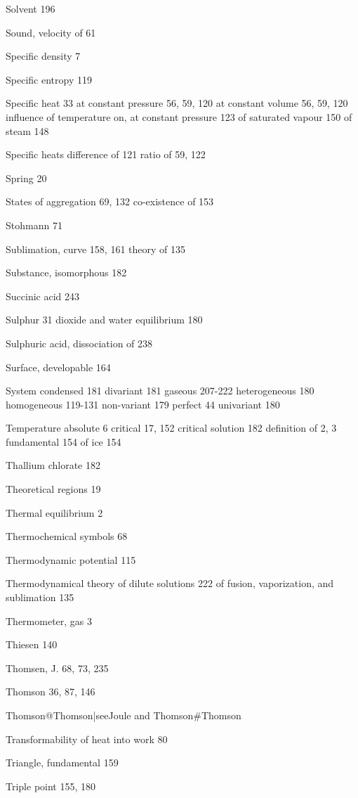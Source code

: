 \documentclass[12pt]{book}[2005/09/16]
\newcommand{\PageSep}[1]{\ignorespaces}
\begin{document}
Solvent 196

Sound, velocity of 61

Specific density 7

Specific entropy 119

Specific heat 33
  at constant pressure 56, 59, 120
  at constant volume 56, 59, 120
  influence of temperature on, at constant pressure 123
  of saturated vapour 150
  of steam 148

Specific heats
  difference of 121
  ratio of 59, 122

Spring 20

States of aggregation 69, 132
  co-existence of 153

Stohmann 71

Sublimation, curve 158, 161
  theory of 135

Substance, isomorphous 182

Succinic acid 243

Sulphur 31
  dioxide and water equilibrium 180

Sulphuric acid, dissociation of 238

Surface, developable 164

System
  condensed 181
  divariant 181
  gaseous 207-222
  heterogeneous 180
  homogeneous 119-131
  non-variant 179
  perfect 44
  univariant 180



Temperature
  absolute 6
  critical 17, 152
  critical solution 182
  definition of 2, 3
  fundamental 154
    of ice 154

Thallium chlorate 182

Theoretical regions 19

Thermal equilibrium 2

Thermochemical symbols 68

Thermodynamic potential 115

Thermodynamical theory
  of dilute solutions 222
  of fusion, vaporization, and sublimation 135

Thermometer, gas 3

Thiesen 140

Thomsen, J. 68, 73, 235

Thomson 36, 87, 146

Thomson@Thomson|see{Joule and Thomson}#Thomson

Transformability of heat into work 80

Triangle, fundamental 159

Triple point 155, 180
\end{document}
